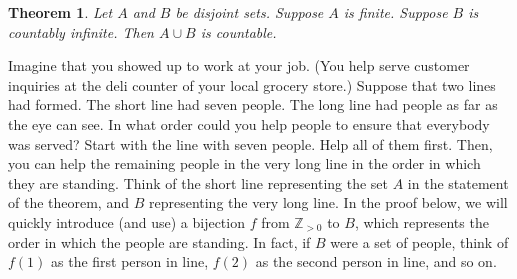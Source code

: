 \documentclass{book}
\newcounter{ekcounter}%
\theoremstyle{ekimcustom}
\newtheorem{theorem}[ekcounter]{Theorem}
\begin{document}
\begin{theorem}
Let $A$ and $B$ be disjoint sets. Suppose $A$ is finite. Suppose $B$ is countably infinite. Then $A \cup B$ is countable.
\end{theorem}
Imagine that you showed up to work at your job. (You help serve customer inquiries at the deli counter of your local grocery store.) Suppose that two lines had formed. The short line had seven people. The long line had people as far as the eye can see. In what order could you help people to ensure that everybody was served? Start with the line with seven people. Help all of them first. Then, you can help the remaining people in the very long line in the order in which they are standing. Think of the short line representing the set $A$ in the statement of the theorem, and $B$ representing the very long line. In the proof below, we will quickly introduce (and use) a bijection $f$ from $\mathbb{Z}_{>0}$ to $B$, which represents the order in which the people are standing. In fact, if $B$ were a set of people, think of $f(1)$ as the first person in line, $f(2)$ as the second person in line, and so on.
\end{document}
